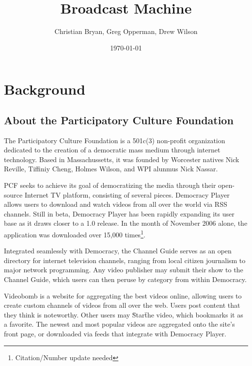 \documentclass[a4paper,12pt]{report}
\author{Christian Bryan, Greg Opperman, Drew Wilson}
\date{\today}
\title{Broadcast Machine}
\begin{document}
\maketitle

\tableofcontents

\chapter{Background}

\section{About the Participatory Culture Foundation}
The Participatory Culture Foundation is a 501c(3) non-profit organization dedicated to the creation of a democratic mass medium through internet technology.
Based in Massachussetts, it was founded by Worcester natives Nick Reville, Tiffiniy Cheng, Holmes Wilson, and WPI alunmus Nick Nassar.


PCF seeks to achieve its goal of democratizing the media through their open-source Internet TV platform, consisting of several pieces.
Democracy Player allows users to download and watch videos from all over the world via RSS channels.
Still in beta, Democracy Player has been rapidly expanding its user base as it draws closer to a 1.0 release.
In the month of November 2006 alone, the application was downloaded over 15,000 times\footnote{Citation/Number update needed}.


Integrated seamlessly with Democracy, the Channel Guide serves as an open directory for internet television channels, ranging from local citizen journalism to major network programming.
Any video publisher may submit their show to the Channel Guide, which users can then peruse by category from within Democracy.


Videobomb is a website for aggregating the best videos online, allowing users to create custom channels of videos from all over the web.
Users post content that they think is noteworthy.
Other users may \"Star\" the video, which bookmarks it as a favorite.
The newest and most popular videos are aggregated onto the site's front page, or downloaded via feeds that integrate with Democracy Player. 
\end{document}
